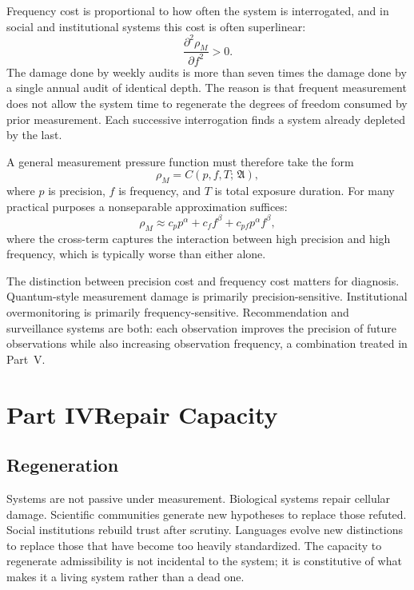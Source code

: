 \documentclass[12pt, a4paper]{article}
\theoremstyle{flyxion}
\newcommand{\fA}{\mathfrak{A}}
\newcommand{\rhoM}{\rho_{M}}
\begin{document}
Frequency cost is proportional to how often the system is interrogated, and in social and institutional systems this cost is often superlinear:
\[
  \frac{\partial^2 \rhoM}{\partial f^2} > 0.
\]
The damage done by weekly audits is more than seven times the damage done by a single annual audit of identical depth. The reason is that frequent measurement does not allow the system time to regenerate the degrees of freedom consumed by prior measurement. Each successive interrogation finds a system already depleted by the last.

A general measurement pressure function must therefore take the form
\[
  \rhoM = C(p, f, T;\, \fA),
\]
where $p$ is precision, $f$ is frequency, and $T$ is total exposure duration. For many practical purposes a nonseparable approximation suffices:
\[
  \rhoM \approx c_p p^\alpha + c_f f^\beta + c_{pf} p^\alpha f^\beta,
\]
where the cross-term captures the interaction between high precision and high frequency, which is typically worse than either alone.

The distinction between precision cost and frequency cost matters for diagnosis. Quantum-style measurement damage is primarily precision-sensitive. Institutional overmonitoring is primarily frequency-sensitive. Recommendation and surveillance systems are both: each observation improves the precision of future observations while also increasing observation frequency, a combination treated in Part~V.


\section*{Part IV\quad Repair Capacity}

\subsection*{Regeneration}

Systems are not passive under measurement. Biological systems repair cellular damage. Scientific communities generate new hypotheses to replace those refuted. Social institutions rebuild trust after scrutiny. Languages evolve new distinctions to replace those that have become too heavily standardized. The capacity to regenerate admissibility is not incidental to the system; it is constitutive of what makes it a living system rather than a dead one.
\end{document}
